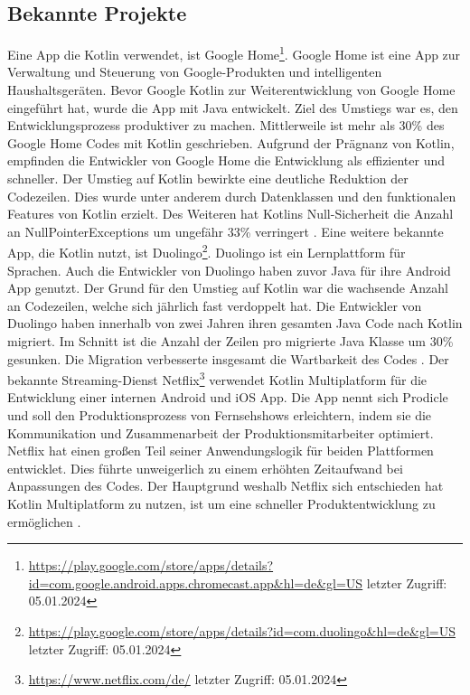 \documentclass{article}
\begin{document}
\subsection{Bekannte Projekte}
Eine App die Kotlin verwendet, ist Google Home\footnote{\url{https://play.google.com/store/apps/details?id=com.google.android.apps.chromecast.app&hl=de&gl=US} letzter Zugriff: 05.01.2024}. Google Home ist eine App zur Verwaltung und Steuerung von Google-Produkten und intelligenten Haushaltsgeräten. Bevor Google Kotlin zur Weiterentwicklung von Google Home eingeführt hat, wurde die App mit Java entwickelt. Ziel des Umstiegs war es, den Entwicklungsprozess produktiver zu machen. Mittlerweile ist mehr als 30\% des Google Home Codes mit Kotlin geschrieben. Aufgrund der Prägnanz von Kotlin, empfinden die Entwickler von Google Home die Entwicklung als effizienter und schneller. Der Umstieg auf Kotlin bewirkte eine deutliche Reduktion der Codezeilen. Dies wurde unter anderem durch Datenklassen und den funktionalen Features von Kotlin erzielt. Des Weiteren hat Kotlins Null-Sicherheit die Anzahl an NullPointerExceptions um ungefähr 33\% verringert \cite{GoogleHome}.
\newline
Eine weitere bekannte App, die Kotlin nutzt, ist Duolingo\footnote{\url{https://play.google.com/store/apps/details?id=com.duolingo&hl=de&gl=US} letzter Zugriff: 05.01.2024}. Duolingo ist ein Lernplattform für Sprachen. Auch die Entwickler von Duolingo haben zuvor Java für ihre Android App genutzt. Der Grund für den Umstieg auf Kotlin war die wachsende Anzahl an Codezeilen, welche sich jährlich fast verdoppelt hat. Die Entwickler von Duolingo haben innerhalb von zwei Jahren ihren gesamten Java Code nach Kotlin migriert. Im Schnitt ist die Anzahl der Zeilen pro migrierte Java Klasse um 30\% gesunken. Die Migration verbesserte insgesamt die Wartbarkeit des Codes \cite{Duolingo}. \newline
Der bekannte Streaming-Dienst Netflix\footnote{\url{https://www.netflix.com/de/} letzter Zugriff: 05.01.2024} verwendet Kotlin Multiplatform für die Entwicklung einer internen Android und iOS App. Die App nennt sich Prodicle und soll den Produktionsprozess von Fernsehshows erleichtern, indem sie die Kommunikation und Zusammenarbeit der Produktionsmitarbeiter optimiert. Netflix hat einen großen Teil seiner Anwendungslogik für beiden Plattformen entwicklet. Dies führte unweigerlich zu einem erhöhten Zeitaufwand bei Anpassungen des Codes. Der Hauptgrund weshalb Netflix sich entschieden hat Kotlin Multiplatform zu nutzen, ist um eine schneller Produktentwicklung zu ermöglichen \cite{Netflx}.
\end{document}
